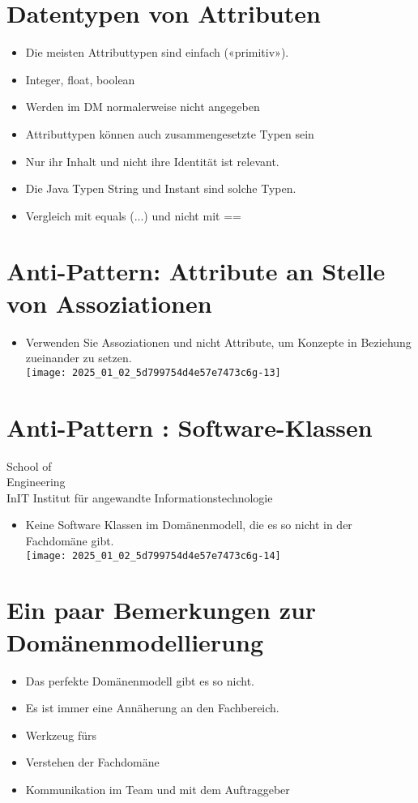 \documentclass[10pt]{article}
\begin{document}
\section*{Datentypen von Attributen}
\begin{itemize}
  \item Die meisten Attributtypen sind einfach («primitiv»).
  \item Integer, float, boolean
  \item Werden im DM normalerweise nicht angegeben
  \item Attributtypen können auch zusammengesetzte Typen sein
  \item Nur ihr Inhalt und nicht ihre Identität ist relevant.
  \item Die Java Typen String und Instant sind solche Typen.
  \item Vergleich mit equals (...) und nicht mit ==
\end{itemize}

\section*{Anti-Pattern: Attribute an Stelle von Assoziationen}
\begin{itemize}
  \item Verwenden Sie Assoziationen und nicht Attribute, um Konzepte in Beziehung zueinander zu setzen.\\
\texttt{[image: 2025\_01\_02\_5d799754d4e57e7473c6g-13]}
\end{itemize}

\section*{Anti-Pattern : Software-Klassen}
School of\\
Engineering\\
InIT Institut für angewandte Informationstechnologie

\begin{itemize}
  \item Keine Software Klassen im Domänenmodell, die es so nicht in der Fachdomäne gibt.\\
\texttt{[image: 2025\_01\_02\_5d799754d4e57e7473c6g-14]}
\end{itemize}

\section*{Ein paar Bemerkungen zur Domänenmodellierung}
\begin{itemize}
  \item Das perfekte Domänenmodell gibt es so nicht.
  \item Es ist immer eine Annäherung an den Fachbereich.
  \item Werkzeug fürs
  \item Verstehen der Fachdomäne
  \item Kommunikation im Team und mit dem Auftraggeber
\end{itemize}
\end{document}
